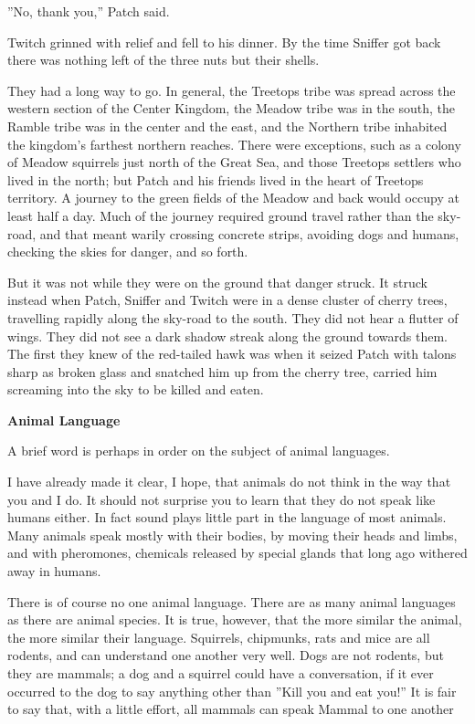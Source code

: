 \documentclass[11pt]{article}
\begin{document}
''No, thank you,'' Patch said.\par
Twitch grinned with relief and fell to his dinner. By the time Sniffer got back there was nothing left of the three nuts but their shells.\par
 They had a long way to go. In general, the Treetops tribe was spread across the western section of the Center Kingdom, the Meadow tribe was in the south, the Ramble tribe was in the center and the east, and the Northern tribe inhabited the kingdom's farthest northern reaches. There were exceptions, such as a colony of Meadow squirrels just north of the Great Sea, and those Treetops settlers who lived in the north; but Patch and his friends lived in the heart of Treetops territory. A journey to the green fields of the Meadow and back would occupy at least half a day. Much of the journey required ground travel rather than the sky-road, and that meant warily crossing concrete strips, avoiding dogs and humans, checking the skies for danger, and so forth.\par
 But it was not while they were on the ground that danger struck. It struck instead when Patch, Sniffer and Twitch were in a dense cluster of cherry trees, travelling rapidly along the sky-road to the south. They did not hear a flutter of wings. They did not see a dark shadow streak along the ground towards them. The first they knew of the red-tailed hawk was when it seized Patch with talons sharp as broken glass and snatched him up from the cherry tree, carried him screaming into the sky to be killed and eaten.\par
\par
{\bf Animal Language\par
}\par
 A brief word is perhaps in order on the subject of animal languages.\par
I have already made it clear, I hope, that animals do not think in the way that you and I do. It should not surprise you to learn that they do not speak like humans either. In fact sound plays little part in the language of most animals. Many animals speak mostly with their bodies, by moving their heads and limbs, and with pheromones, chemicals released by special glands that long ago withered away in humans.\par
 There is of course no one animal language. There are as many animal languages as there are animal species. It is true, however, that the more similar the animal, the more similar their language. Squirrels, chipmunks, rats and mice are all rodents, and can understand one another very well. Dogs are not rodents, but they are mammals; a dog and a squirrel could have a conversation, if it ever occurred to the dog to say anything other than ''Kill you and eat you!'' It is fair to say that, with a little effort, all mammals can speak Mammal to one another %
\end{document}
